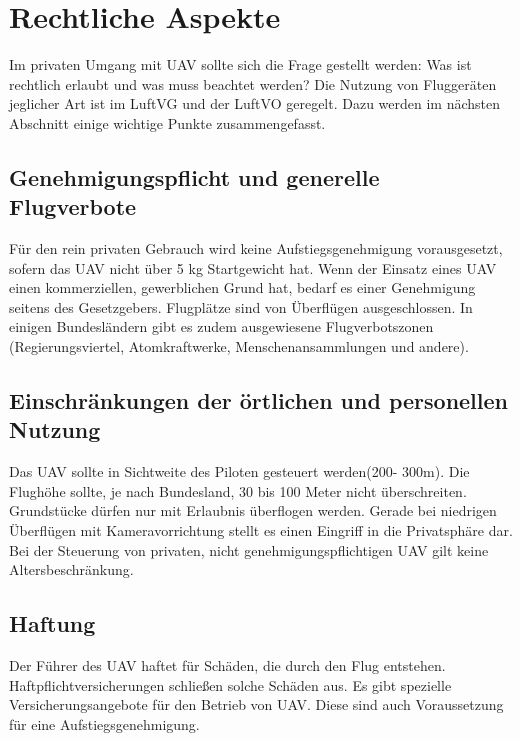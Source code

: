 \section{Rechtliche Aspekte\cite{ct}}

Im privaten Umgang mit \ac{UAV} sollte sich die Frage gestellt werden: Was ist rechtlich erlaubt und was muss beachtet werden? Die Nutzung von Fluggeräten jeglicher Art ist im \ac{LuftVG}\cite{luftvg} und der \ac{LuftVO}\cite{luftvo} geregelt. Dazu werden im nächsten Abschnitt einige wichtige Punkte zusammengefasst.

\subsection{Genehmigungspflicht und generelle Flugverbote}
Für den rein privaten Gebrauch wird keine Aufstiegsgenehmigung vorausgesetzt, sofern das \ac{UAV} nicht über 5 kg Startgewicht hat. Wenn der Einsatz eines \ac{UAV} einen kommerziellen, gewerblichen Grund hat, bedarf es einer Genehmigung seitens des Gesetzgebers. Flugplätze sind von Überflügen ausgeschlossen. In einigen Bundesländern gibt es zudem ausgewiesene Flugverbotszonen
(Regierungsviertel, Atomkraftwerke, Menschenansammlungen und andere).
\subsection{Einschränkungen der örtlichen und personellen Nutzung}
Das \ac{UAV} sollte in Sichtweite des Piloten gesteuert werden(200- 300m). Die Flughöhe sollte, je nach Bundesland, 30 bis 100 Meter nicht überschreiten. Grundstücke dürfen nur mit Erlaubnis überflogen werden. Gerade bei niedrigen Überflügen mit Kameravorrichtung stellt es einen Eingriff in die Privatsphäre dar. Bei der Steuerung von privaten, nicht genehmigungspflichtigen \ac{UAV} gilt keine Altersbeschränkung.
\subsection{Haftung}
Der Führer des \ac{UAV} haftet für Schäden, die durch den Flug entstehen. Haftpflichtversicherungen schließen solche Schäden aus. Es gibt spezielle Versicherungsangebote für den Betrieb von \ac{UAV}. Diese sind auch Voraussetzung für eine Aufstiegsgenehmigung.
